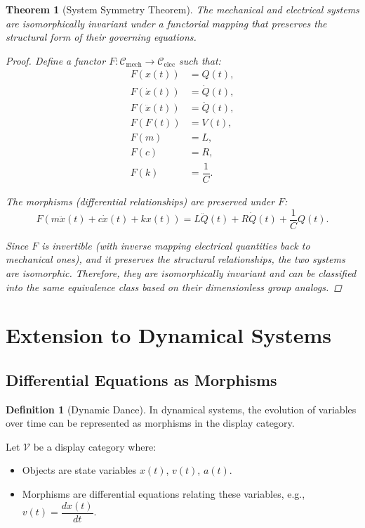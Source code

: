 \documentclass{article}
\newtheorem{theorem}{Theorem}[section]
\theoremstyle{definition}
\newtheorem{definition}{Definition}[section]
\theoremstyle{remark}
\begin{document}
	\begin{theorem}[System Symmetry Theorem]
		The mechanical and electrical systems are isomorphically invariant under a functorial mapping that preserves the structural form of their governing equations.
		
		\begin{proof}
			Define a functor $F: \mathcal{C}_{\text{mech}} \rightarrow \mathcal{C}_{\text{elec}}$ such that:
			\begin{align*}
				F(x(t)) &= Q(t), \\
				F(\dot{x}(t)) &= \dot{Q}(t), \\
				F(\ddot{x}(t)) &= \ddot{Q}(t), \\
				F(F(t)) &= V(t), \\
				F(m) &= L, \\
				F(c) &= R, \\
				F(k) &= \dfrac{1}{C}.
			\end{align*}
			
			The morphisms (differential relationships) are preserved under $F$:
			\[
			F\left( m \ddot{x}(t) + c \dot{x}(t) + k x(t) \right) = L \ddot{Q}(t) + R \dot{Q}(t) + \dfrac{1}{C} Q(t).
			\]
			
			Since $F$ is invertible (with inverse mapping electrical quantities back to mechanical ones), and it preserves the structural relationships, the two systems are isomorphic. Therefore, they are isomorphically invariant and can be classified into the same equivalence class based on their dimensionless group analogs.
		\end{proof}
	\end{theorem}
	
	\section{Extension to Dynamical Systems}
	
	\subsection{Differential Equations as Morphisms}
	
	\begin{definition}[Dynamic Dance]
		In dynamical systems, the evolution of variables over time can be represented as morphisms in the display category.
		
		Let $\mathcal{V}$ be a display category where:
		\begin{itemize}
			\item Objects are state variables $x(t)$, $v(t)$, $a(t)$.
			\item Morphisms are differential equations relating these variables, e.g., $v(t) = \dfrac{dx(t)}{dt}$.
		\end{itemize}
	\end{definition}
	
\end{document}
